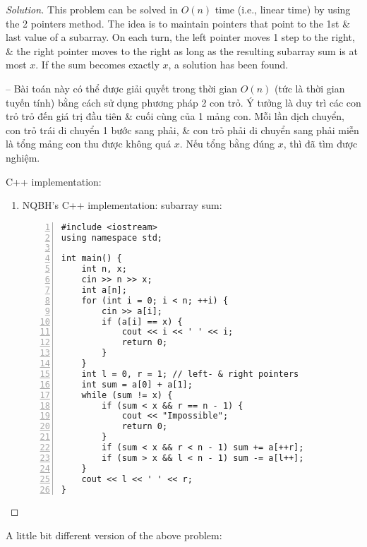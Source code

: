 \documentclass{article}
\begin{document}
\begin{proof}[Solution]
    This problem can be solved in $O(n)$ time (i.e., linear time) by using the 2 pointers method. The idea is to maintain pointers that point to the 1st \& last value of a subarray. On each turn, the left pointer moves 1 step to the right, \& the right pointer moves to the right as long as the resulting subarray sum is at most $x$. If the sum becomes exactly $x$, a solution has been found.

    -- Bài toán này có thể được giải quyết trong thời gian $O(n)$ (tức là thời gian tuyến tính) bằng cách sử dụng phương pháp 2 con trỏ. Ý tưởng là duy trì các con trỏ trỏ đến giá trị đầu tiên \& cuối cùng của 1 mảng con. Mỗi lần dịch chuyển, con trỏ trái di chuyển 1 bước sang phải, \& con trỏ phải di chuyển sang phải miễn là tổng mảng con thu được không quá $x$. Nếu tổng bằng đúng $x$, thì đã tìm được nghiệm.

    C++ implementation:
    \begin{enumerate}
        \item NQBH's C++ implementation: subarray sum:
        \begin{Verbatim}[numbers=left,xleftmargin=0mm]
#include <iostream>
using namespace std;

int main() {
    int n, x;
    cin >> n >> x;
    int a[n];
    for (int i = 0; i < n; ++i) {
        cin >> a[i];
        if (a[i] == x) {
            cout << i << ' ' << i;
            return 0;
        }
    }
    int l = 0, r = 1; // left- & right pointers
    int sum = a[0] + a[1];
    while (sum != x) {
        if (sum < x && r == n - 1) {
            cout << "Impossible";
            return 0;
        }
        if (sum < x && r < n - 1) sum += a[++r];
        if (sum > x && l < n - 1) sum -= a[l++];
    }
    cout << l << ' ' << r;
}
        \end{Verbatim}
    \end{enumerate}
\end{proof}
A little bit different version of the above problem:
\end{document}
